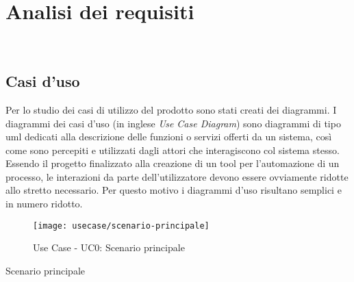 
\chapter{Analisi dei requisiti}
\label{cap:analisi-requisiti}

\\

\section{Casi d'uso}

Per lo studio dei casi di utilizzo del prodotto sono stati creati dei diagrammi.
I diagrammi dei casi d'uso (in inglese \emph{Use Case Diagram}) sono diagrammi di tipo \gls{uml} dedicati alla descrizione delle funzioni o servizi offerti da un sistema, così come sono percepiti e utilizzati dagli attori che interagiscono col sistema stesso.
Essendo il progetto finalizzato alla creazione di un tool per l'automazione di un processo, le interazioni da parte dell'utilizzatore devono essere ovviamente ridotte allo stretto necessario. Per questo motivo i diagrammi d'uso risultano semplici e in numero ridotto.

\begin{figure}[!h] 
    \centering 
    \texttt{[image: usecase/scenario-principale]} 
    \caption{Use Case - UC0: Scenario principale}
\end{figure}

\begin{usecase}{0}{Scenario principale}
\label{uc:scenario-principale}
\end{usecase}


